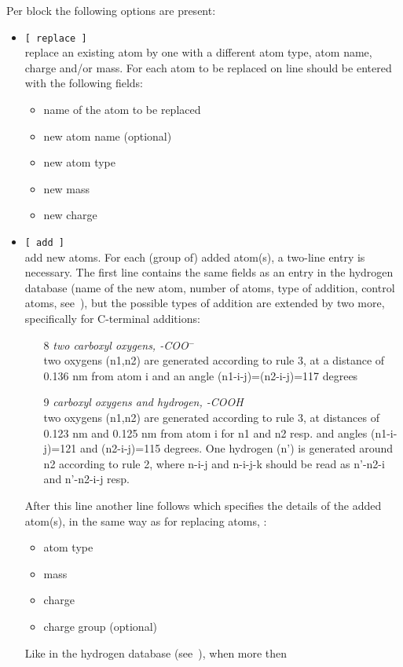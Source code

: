 Per block the following options are present:
\begin{itemize}
\item {\tt [~replace~]} \\
replace an existing atom by one with a different atom type, atom name,
charge and/or mass. For each atom to be replaced on line should be
entered with the following fields:
\begin{itemize}
\item name of the atom to be replaced
\item new atom name (optional)
\item new atom type
\item new mass
\item new charge
\end{itemize}
\item {\tt [~add~]} \\
add new atoms. For each (group of) added atom(s), a two-line entry is
necessary. The first line contains the same fields as an entry in the
hydrogen database (name of the new atom, 
number of atoms, type of addition, control atoms,
see~), but the possible types of addition are extended
by two more, specifically for C-terminal additions:
\begin{enumerate}
\item[8]{\em two carboxyl oxygens, -COO{$^-$}}\\
two oxygens (n1,n2) are generated according to rule 3, at a distance
of 0.136 nm from atom i and an angle (n1-i-j)=(n2-i-j)=117 degrees
\item[9]{\em carboxyl oxygens and hydrogen, -COOH}\\
two oxygens (n1,n2) are generated according to rule 3, at distances of
0.123 nm and 0.125 nm from atom i for n1 and n2 resp. and angles
(n1-i-j)=121 and (n2-i-j)=115 degrees. One hydrogen (n') is generated
around n2 according to rule 2, where n-i-j and n-i-j-k should be read
as n'-n2-i and n'-n2-i-j resp.
\end{enumerate}
After this line another line follows which specifies the details of
the added atom(s), in the same way as for replacing atoms, {\ie}: 
\begin{itemize}
\item atom type
\item mass
\item charge
\item charge group (optional)
\end{itemize}
Like in the hydrogen database (see~), when more then

\end{itemize}
